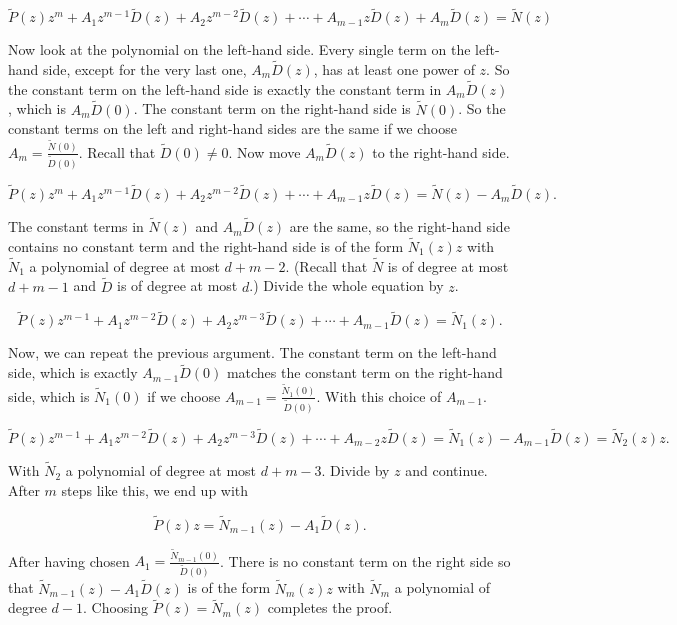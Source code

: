 \[
    \tilde{P}(z)z^m + A_1 z^{m-1} \tilde{D}(z) + A_2 z^{m-2} \tilde{D}(z) + \cdots + A_{m-1} z 
    \tilde{D}(z) + A_m \tilde{D}(z) = \tilde{N}(z)
\]

Now look at the polynomial on the left-hand side. Every single term on the left-hand side,
except for the very last one, \(A_m \tilde{D}(z)\), has at least one power of \(z\). So the constant 
term on the left-hand side is exactly the constant term in \(A_m \tilde{D}(z)\), which is 
\(A_m \tilde{D}(0)\). The constant term on the right-hand side is \(\tilde{N}(0)\). So the constant terms 
on the left and right-hand sides are the same if we choose \(A_m = \frac{\tilde{N}(0)}{\tilde{D}(0)}\). 
Recall that \(\tilde{D}(0) \neq 0\). Now move \(A_m \tilde{D}(z)\) to the right-hand side.

\[
    \tilde{P}(z)z^m + A_1 z^{m-1} \tilde{D}(z) + A_2 z^{m-2} \tilde{D}(z) + \cdots + A_{m-1} z 
    \tilde{D}(z) = \tilde{N}(z) - A_m \tilde{D}(z).
\]

The constant terms in \(\tilde{N}(z)\) and \(A_m \tilde{D}(z)\) are the same, so the right-hand side 
contains no constant term and the right-hand side is of the form \(\tilde{N}_1(z)z\) with \(\tilde{N}_1\) 
a polynomial of degree at most \(d + m - 2\). (Recall that \(\tilde{N}\) is of degree at most 
\(d + m - 1\) and \(\tilde{D}\) is of degree at most \(d\).) Divide the whole equation by \(z\).

\[
    \tilde{P}(z)z^{m-1} + A_1 z^{m-2} \tilde{D}(z) + A_2 z^{m-3} \tilde{D}(z) + \cdots + A_{m-1} 
    \tilde{D}(z) = \tilde{N}_1(z).
\]

Now, we can repeat the previous argument. The constant term on the left-hand side, which
is exactly \(A_{m-1} \tilde{D}(0)\) matches the constant term on the right-hand side, which is 
\(\tilde{N}_1(0)\) if we choose \(A_{m-1} = \frac{\tilde{N}_1(0)}{\tilde{D}(0)}\). With this choice of 
\(A_{m-1}\).

\[
    \tilde{P}(z)z^{m-1} + A_1 z^{m-2} \tilde{D}(z) + A_2 z^{m-3} \tilde{D}(z) + \cdots + A_{m-2} z 
    \tilde{D}(z) = \tilde{N}_1(z) - A_{m-1} \tilde{D}(z) = \tilde{N}_2(z)z.
\]

With \(\tilde{N}_2\) a polynomial of degree at most \(d + m - 3\). Divide by \(z\) and continue. 
After \(m\) steps like this, we end up with

\[
    \tilde{P}(z)z = \tilde{N}_{m-1}(z) - A_1 \tilde{D}(z).
\]

After having chosen \(A_1 = \frac{\tilde{N}_{m-1}(0)}{\tilde{D}(0)}\). There is no constant term on the 
right side so that \(\tilde{N}_{m-1}(z) - A_1 \tilde{D}(z)\) is of the form \(\tilde{N}_m(z)z\) with 
\(\tilde{N}_m\) a polynomial of degree \(d - 1\). Choosing \(\tilde{P}(z) = \tilde{N}_m(z)\) completes 
the proof.

